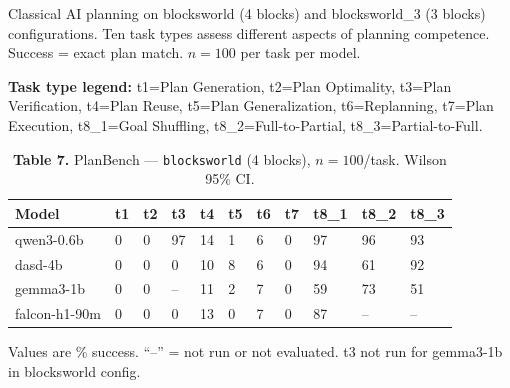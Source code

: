 \documentclass[11pt,letterpaper]{article}
\begin{document}
\vspace{0.2cm}

Classical AI planning on blocksworld (4 blocks) and blocksworld\_3 (3 blocks) configurations. Ten task types assess different aspects of planning competence. Success = exact plan match. $n=100$ per task per model.

\vspace{0.2cm}

\textbf{Task type legend:} t1=Plan Generation, t2=Plan Optimality, t3=Plan Verification, t4=Plan Reuse, t5=Plan Generalization, t6=Replanning, t7=Plan Execution, t8\_1=Goal Shuffling, t8\_2=Full-to-Partial, t8\_3=Partial-to-Full.

\vspace{0.2cm}

\begin{table}[h!]
\centering
\caption*{\textbf{Table 7.} PlanBench --- \texttt{blocksworld} (4 blocks), $n=100$/task. Wilson 95\% CI.}
\begin{tabular}{l R{0.8cm} R{0.8cm} R{0.8cm} R{0.8cm} R{0.8cm} R{0.8cm} R{0.8cm} R{0.8cm} R{0.8cm} R{0.8cm}}
\toprule
\textbf{Model} & \textbf{t1} & \textbf{t2} & \textbf{t3} & \textbf{t4} & \textbf{t5} & \textbf{t6} & \textbf{t7} & \textbf{t8\_1} & \textbf{t8\_2} & \textbf{t8\_3} \\
\midrule
{} qwen3-0.6b  &  0 &  0 & 97 & 14 &  1 &  6 &  0 & 97 & 96 & 93 \\
 dasd-4b     &  0 &  0 &  0 & 10 &  8 &  6 &  0 & 94 & 61 & 92 \\
gemma3-1b    &  0 &  0 & -- & 11 &  2 &  7 &  0 & 59 & 73 & 51 \\
falcon-h1-90m&  0 &  0 &  0 & 13 &  0 &  7 &  0 & 87 & -- & -- \\
\bottomrule
\end{tabular}

\vspace{2pt}
{\footnotesize\textcolor{notegray}{Values are \% success. ``--'' = not run or not evaluated. t3 not run for gemma3-1b in blocksworld config.}}
\end{table}

\vspace{0.2cm}
\end{document}
